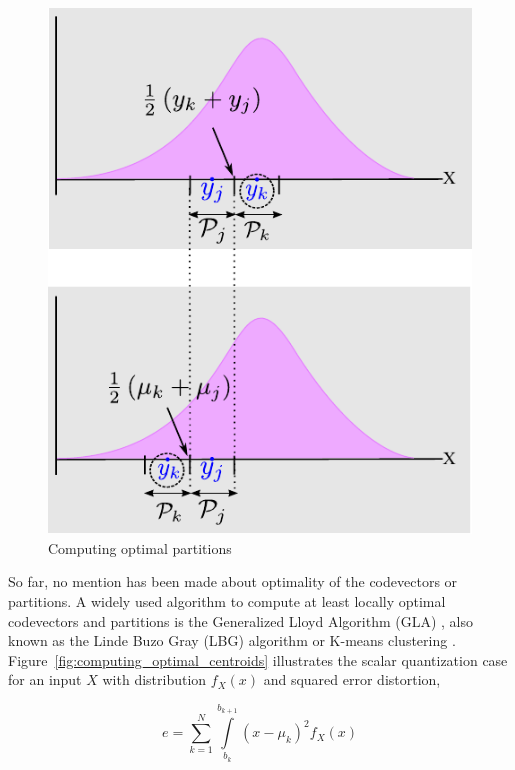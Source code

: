 \begin{Body}
								\begin{figure}[t]		
								\center	
								\includegraphics[height=0.5\textheight]{thesis/Quantization_optimalPartitions2.pdf}
								\caption{Computing optimal partitions}
								\label{fig:computing_optimal_partitions}
								\end{figure}

So far, no mention has been made about optimality of the codevectors or partitions.  A widely used algorithm to compute at least locally optimal codevectors and partitions is the Generalized Lloyd Algorithm (GLA) \cite{1991_BOOK_VQ_GershoGray}, also known as the Linde Buzo Gray (LBG) algorithm \cite{1982_JNL_LeastSquaresQuantization_Lloyd} or K-means clustering \cite{1967_CNF_Kmeans_Macqueen}.  Figure~\ref{fig:computing_optimal_centroids} illustrates the scalar quantization case for an input $X$ with distribution $f_X(x)$ and squared error distortion, 

\begin{equation}
e=\sum\limits_{k=1}^{N} \int\limits_{b_k}^{b_{k+1}}(x-\mu_k)^2f_X(x)
\end{equation}


\end{Body}
